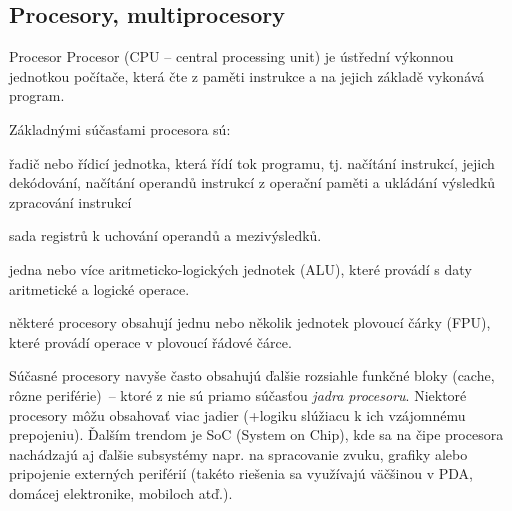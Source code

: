 \subsection{Procesory, multiprocesory}

\begin{definiceN}{Procesor} 
Procesor (CPU – central processing unit) je ústřední výkonnou jednotkou počítače, která čte z paměti instrukce a na jejich základě vykonává program.

Základnými súčasťami procesora sú:
\begin{pitemize}
	\item řadič nebo řídicí jednotka, která řídí tok programu, tj. načítání instrukcí, jejich dekódování, načítání operandů instrukcí z operační paměti a ukládání výsledků zpracování instrukcí
	\item sada registrů k uchování operandů a mezivýsledků.
	\item jedna nebo více aritmeticko-logických jednotek (ALU), které provádí s daty aritmetické a logické operace.
	\item některé procesory obsahují jednu nebo několik jednotek plovoucí čárky (FPU), které provádí operace v plovoucí řádové čárce.
\end{pitemize}
\end{definiceN}

\begin{poznamka}
Súčasné procesory navyše často obsahujú ďalšie rozsiahle funkčné bloky (cache, rôzne periférie)~-- ktoré z  nie sú priamo súčasťou \emph{jadra procesoru}. Niektoré procesory môžu obsahovať viac jadier (+logiku slúžiacu k ich vzájomnému prepojeniu). Ďalším trendom je SoC (System on Chip), kde sa na čipe procesora nachádzajú aj ďalšie subsystémy napr. na spracovanie zvuku, grafiky alebo pripojenie externých periférií (takéto riešenia sa využívajú väčšinou v PDA, domácej elektronike, mobiloch atď.).
\end{poznamka}

